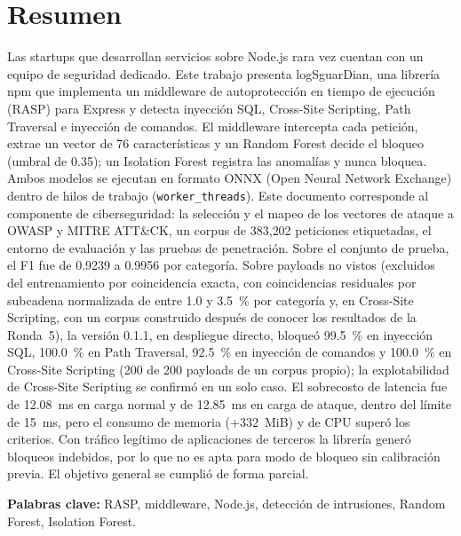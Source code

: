 \ifdefined\modoensamble
\else
	
	\chapter*{Resumen}
\fi

Las startups que desarrollan servicios sobre Node.js rara vez cuentan con un equipo de seguridad dedicado. Este trabajo presenta logSguarDian, una librería npm que implementa un middleware de autoprotección en tiempo de ejecución (RASP) para Express y detecta inyección SQL, Cross-Site Scripting, Path Traversal e inyección de comandos. El middleware intercepta cada petición, extrae un vector de 76 características y un Random Forest decide el bloqueo (umbral de 0.35); un Isolation Forest registra las anomalías y nunca bloquea. Ambos modelos se ejecutan en formato ONNX (Open Neural Network Exchange) dentro de hilos de trabajo (\texttt{worker\_threads}). Este documento corresponde al componente de ciberseguridad: la selección y el mapeo de los vectores de ataque a OWASP y MITRE ATT\&CK, un corpus de 383{,}202 peticiones etiquetadas, el entorno de evaluación y las pruebas de penetración. Sobre el conjunto de prueba, el F1 fue de 0.9239 a 0.9956 por categoría. Sobre payloads no vistos (excluidos del entrenamiento por coincidencia exacta, con coincidencias residuales por subcadena normalizada de entre 1.0 y 3.5~\% por categoría y, en Cross-Site Scripting, con un corpus construido después de conocer los resultados de la Ronda~5), la versión 0.1.1, en despliegue directo, bloqueó 99.5~\% en inyección SQL, 100.0~\% en Path Traversal, 92.5~\% en inyección de comandos y 100.0~\% en Cross-Site Scripting (200 de 200 payloads de un corpus propio); la explotabilidad de Cross-Site Scripting se confirmó en un solo caso. El sobrecosto de latencia fue de 12.08~ms en carga normal y de 12.85~ms en carga de ataque, dentro del límite de 15~ms, pero el consumo de memoria (+332~MiB) y de CPU superó los criterios. Con tráfico legítimo de aplicaciones de terceros la librería generó bloqueos indebidos, por lo que no es apta para modo de bloqueo sin calibración previa. El objetivo general se cumplió de forma parcial.

\medskip
\noindent\textbf{Palabras clave:} RASP, middleware, Node.js, detección de intrusiones, Random Forest, Isolation Forest.

\ifdefined\modoensamble
\else
	
\fi

